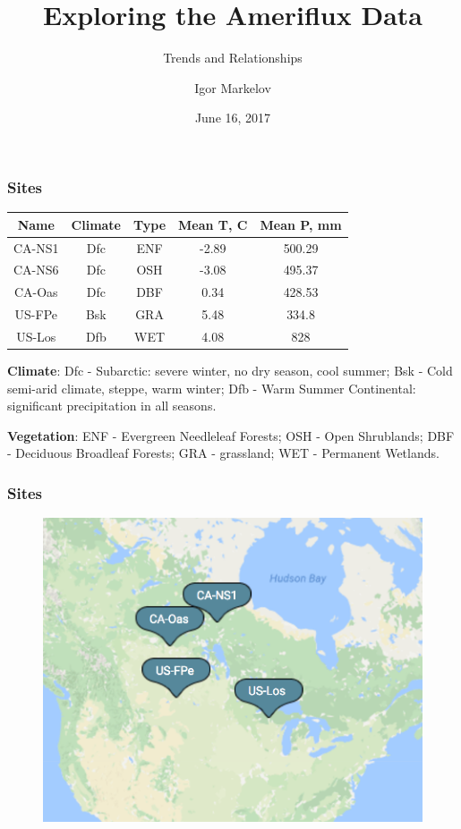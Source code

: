 \documentclass{beamer}
\title{Exploring the Ameriflux Data}
\subtitle{Trends and Relationships}
\author{Igor Markelov}
\institute{Upscaling Group Meeting}
\date{June 16, 2017}
\begin{document}
\begin{frame}
\titlepage
\end{frame}



\begin{frame}
\frametitle{Sites}

\begin{center}
\begin{tabular}{| c | c | c | c | c |}
\hline
Name & Climate & Type & Mean T, C & Mean P, mm \\ \hline
CA-NS1 & Dfc & ENF & -2.89 & 500.29 \\\hline
CA-NS6 & Dfc & OSH & -3.08 & 495.37 \\\hline
CA-Oas & Dfc & DBF & 0.34 & 428.53 \\\hline
US-FPe & Bsk & GRA & 5.48 & 334.8 \\\hline
US-Los &  Dfb& WET &   4.08 & 828\\\hline

\hline
\end{tabular}
\end{center}


\textbf{Climate}:
Dfc - Subarctic: severe winter, no dry season, cool summer;
Bsk - Cold semi-arid climate, steppe, warm winter;
Dfb - Warm Summer Continental: significant precipitation in all seasons.

\textbf{Vegetation}:
ENF - Evergreen Needleleaf Forests;
OSH - Open Shrublands;
DBF - Deciduous Broadleaf Forests;
GRA - grassland;
WET - Permanent Wetlands.


\end{frame}


\begin{frame}
\frametitle{Sites}
\begin{figure}
\includegraphics[width=\textwidth]{sites.png}
\end{figure}
\end{frame}
\end{document}
